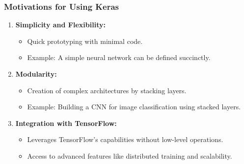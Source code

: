 \documentclass[aspectratio=169]{beamer}
\begin{document}
\begin{frame}[fragile]
    \frametitle{Motivations for Using Keras}
    \begin{enumerate}
        \item \textbf{Simplicity and Flexibility:}
        \begin{itemize}
            \item Quick prototyping with minimal code.
            \item Example: A simple neural network can be defined succinctly.
        \end{itemize}
        
        \item \textbf{Modularity:}
        \begin{itemize}
            \item Creation of complex architectures by stacking layers.
            \item Example: Building a CNN for image classification using stacked layers.
        \end{itemize}
        
        \item \textbf{Integration with TensorFlow:}
        \begin{itemize}
            \item Leverages TensorFlow's capabilities without low-level operations.
            \item Access to advanced features like distributed training and scalability.
        \end{itemize}
    \end{enumerate}
\end{frame}
\end{document}
